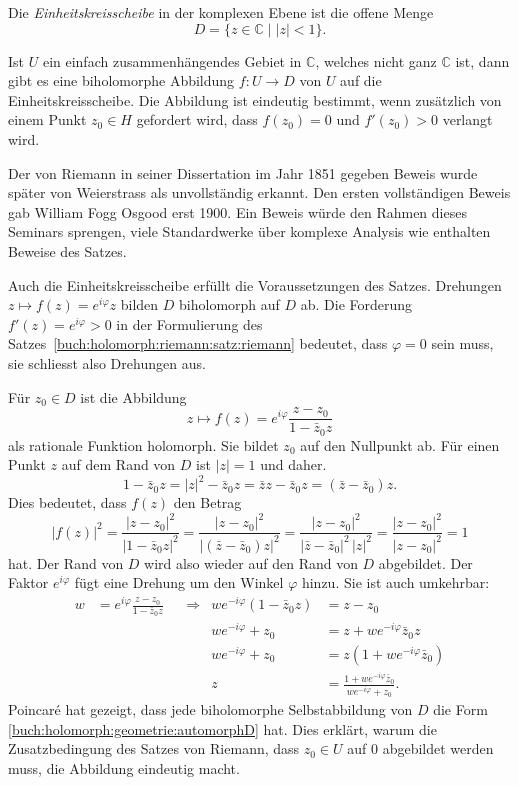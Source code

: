\begin{definition}[Einheitskreisscheibe]
Die \emph{Einheitskreisscheibe} in der komplexen Ebene ist die offene Menge
\[
D
=
\{
z\in\mathbb{C}
\mid
|z|<1
\}.
\]
\end{definition}

\begin{satz}[Riemann]
\label{buch:holomorph:riemann:satz:riemann}
Ist $U$ ein einfach zusammenhängendes Gebiet in $\mathbb{C}$, welches nicht
ganz $\mathbb{C}$ ist, dann gibt es eine biholomorphe Abbildung
$f\colon U\to D$ von $U$ auf die Einheitskreisscheibe.
Die Abbildung ist eindeutig bestimmt, wenn zusätzlich von einem Punkt
$z_0\in H$ gefordert wird, dass $f(z_0)=0$ und $f'(z_0)>0$ verlangt wird.
\end{satz}

Der von Riemann in seiner Dissertation im Jahr 1851 gegeben Beweis
wurde später von Weierstrass als unvollständig erkannt.
%
Den ersten vollständigen Beweis gab William Fogg Osgood erst 1900.
%
Ein Beweis würde den Rahmen dieses Seminars sprengen, viele Standardwerke
über komplexe Analysis wie \cite{buch:alfohrs,buch:lang} enthalten
Beweise des Satzes.

Auch die Einheitskreisscheibe erfüllt die Voraussetzungen des Satzes.
Drehungen $z \mapsto f(z)=e^{i\varphi} z$ bilden $D$ biholomorph auf $D$ ab.
Die Forderung $f'(z)=e^{i\varphi}>0$ in der Formulierung des
Satzes~\ref{buch:holomorph:riemann:satz:riemann}
bedeutet, dass $\varphi=0$ sein muss,
sie schliesst also Drehungen aus.

Für $z_0\in D$ ist die Abbildung
\begin{equation}
z
\mapsto
f(z)
=
e^{i\varphi}\frac{z-z_0}{1-\bar{z}_0z}
\label{buch:holomorph:geometrie:automorphD}
\end{equation}
als rationale Funktion holomorph.
Sie bildet $z_0$ auf den Nullpunkt ab.
Für einen Punkt $z$ auf dem Rand von $D$ ist $|z|=1$ und daher.
\[
1-\bar{z}_0z
=
|z|^2-\bar{z}_0z
=
\bar{z}z-\bar{z}_0z
=
(\bar{z}-\bar{z}_0)z.
\]
Dies bedeutet, dass $f(z)$ den Betrag
\[
|f(z)|^2
=
\frac{|z-z_0|^2}{|1-\bar{z}_0z|^2}
=
\frac{|z-z_0|^2}{|(\bar{z}-\bar{z}_0)z|^2}
=
\frac{|z-z_0|^2}{|\bar{z}-\bar{z}_0|^2\,|z|^2}
=
\frac{|z-z_0|^2}{ |z-z_0|^2}
=
1
\]
hat.
Der Rand von $D$ wird also wieder auf den Rand von $D$ abgebildet.
Der Faktor $e^{i\varphi}$ fügt eine Drehung um den Winkel $\varphi$ hinzu.
Sie ist auch umkehrbar:
\begin{align*}
w &= e^{i\varphi}\frac{z-z_0}{1-\bar{z}_0z}
&&\Rightarrow&
we^{-i\varphi}(1-\bar{z}_0z) &= z-z_0
\\
&&&&
we^{-i\varphi} + z_0 &= z+we^{-i\varphi}\bar{z}_0z
\\
&&&&
we^{-i\varphi} + z_0 &= z(1+we^{-i\varphi}\bar{z}_0)
\\
&&&&
z&=
\frac{1+we^{-i\varphi}\bar{z}_0}{ we^{-i\varphi} + z_0}.
\end{align*}
Poincaré hat gezeigt, dass jede biholomorphe Selbstabbildung von $D$
die Form \eqref{buch:holomorph:geometrie:automorphD} hat.
Dies erklärt, warum die Zusatzbedingung des Satzes von Riemann, dass
$z_0\in U$ auf $0$ abgebildet werden muss, die Abbildung eindeutig macht.


